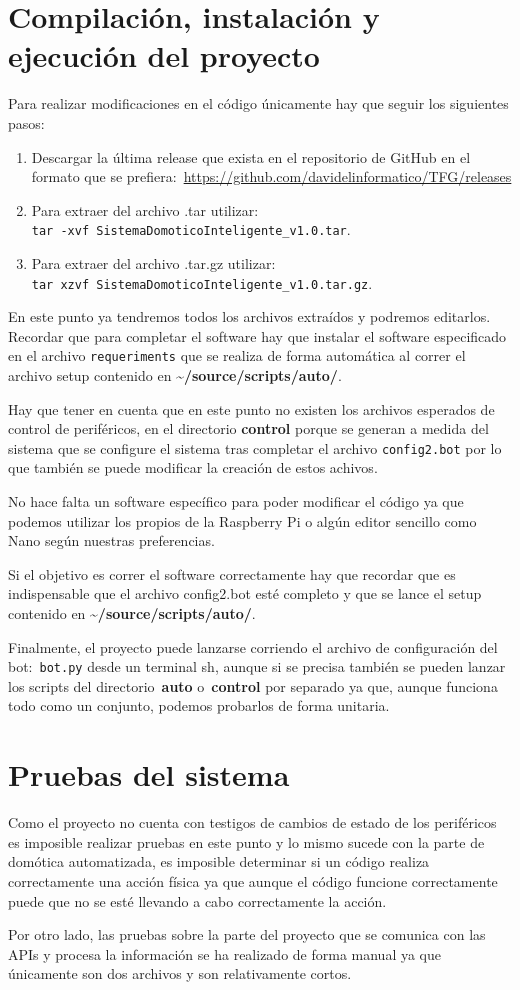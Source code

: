 \section{Compilación, instalación y ejecución del proyecto}
Para realizar modificaciones en el código únicamente hay que seguir los siguientes pasos:
\begin{enumerate}
    \item Descargar la última release que exista en el repositorio de GitHub en el formato que se prefiera:~\url{https://github.com/davidelinformatico/TFG/releases}
    \item Para extraer del archivo .tar utilizar:~\\ \texttt{tar -xvf SistemaDomoticoInteligente\_v1.0.tar}.
    \item Para extraer del archivo .tar.gz utilizar:~\\ \texttt{tar xzvf SistemaDomoticoInteligente\_v1.0.tar.gz}.
\end{enumerate}
En este punto ya tendremos todos los archivos extraídos y podremos editarlos. Recordar que para completar el software hay que instalar el software especificado en el archivo \texttt{requeriments} que se realiza de forma automática al correr el archivo setup contenido en \textbf{\textasciitilde/source/scripts/auto/}. 

Hay que tener en cuenta que en este punto no existen los archivos esperados de control de periféricos, en el directorio \textbf{control} porque se generan a medida del sistema que se configure el sistema tras completar el archivo \texttt{config2.bot} por lo que también se puede modificar la creación de estos achivos.

No hace falta un software específico para poder modificar el código ya que podemos utilizar los propios de la Raspberry Pi o algún editor sencillo como Nano según nuestras preferencias.

Si el objetivo es correr el software correctamente hay que recordar que es indispensable que el archivo config2.bot esté completo y que se lance el setup contenido en \textbf{\textasciitilde/source/scripts/auto/}.

Finalmente, el proyecto puede lanzarse corriendo el archivo de configuración del bot:~\texttt{bot.py} desde un terminal sh, aunque si se precisa también se pueden lanzar los scripts del directorio~\textbf{auto} o~\textbf{control} por separado ya que, aunque funciona todo como un conjunto, podemos probarlos de forma unitaria.

\section{Pruebas del sistema}
Como el proyecto no cuenta con testigos de cambios de estado de los periféricos es imposible realizar pruebas en este punto y lo mismo sucede con la parte de domótica automatizada, es imposible determinar si un código realiza correctamente una acción física ya que aunque el código funcione correctamente puede que no se esté llevando a cabo correctamente la acción.

Por otro lado, las pruebas sobre la parte del proyecto que se comunica con las APIs y procesa la información se ha realizado de forma manual ya que únicamente son dos archivos y son relativamente cortos. 


